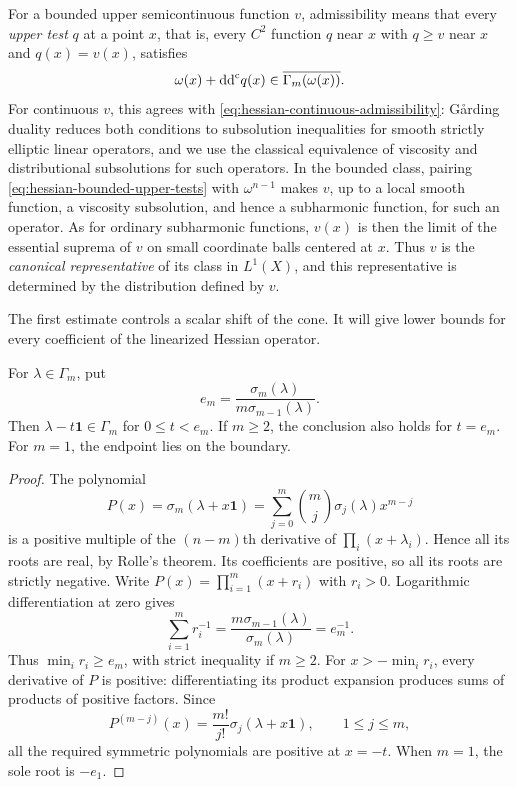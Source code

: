 For a bounded upper semicontinuous function $v$, admissibility means that
every \emph{upper test} $q$ at a point $x$, that is, every $C^2$ function
$q$ near $x$ with $q\geq v$ near $x$ and $q(x)=v(x)$, satisfies
\begin{equation}\label{eq:hessian-bounded-upper-tests}
 \omega(x)+\mathrm{dd}^{\mathrm{c}} q(x)\in\overline{\Gamma_m(\omega(x))}.
\end{equation}
For continuous $v$, this agrees with
\eqref{eq:hessian-continuous-admissibility}: G\aa rding duality reduces
both conditions to subsolution inequalities for smooth strictly elliptic
linear operators, and we use the classical equivalence of viscosity and
distributional subsolutions for such operators. In the bounded class,
pairing \eqref{eq:hessian-bounded-upper-tests} with $\omega^{n-1}$
makes $v$, up to a local smooth function, a viscosity subsolution, and
hence a subharmonic function, for such an operator. As for ordinary
subharmonic functions, $v(x)$ is then the limit of the essential
suprema of $v$ on small coordinate balls centered at $x$. Thus $v$ is
the \emph{canonical representative} of its class in $L^1(X)$, and
this representative is determined by the distribution defined by $v$.

The first estimate controls a scalar shift of the cone. It will give
lower bounds for every coefficient of the linearized Hessian operator.

\begin{lemma}\label{hessian:hessian-cone-shift}
For $\lambda\in\Gamma_m$, put
\[
 e_m=\frac{\sigma_m(\lambda)}{m\sigma_{m-1}(\lambda)}.
\]
Then $\lambda-t\mathbf1\in\Gamma_m$ for $0\leq t<e_m$. If $m\geq2$, the conclusion also holds for $t=e_m$. For $m=1$, the endpoint lies on the boundary.
\end{lemma}
\begin{proof}
The polynomial
\[
 P(x)=\sigma_m(\lambda+x\mathbf1)
     =\sum_{j=0}^m\binom mj\sigma_j(\lambda)x^{m-j}
\]
is a positive multiple of the $(n-m)$th derivative of $\prod_i(x+\lambda_i)$. Hence all its roots are real, by Rolle's theorem. Its coefficients are positive, so all its roots are strictly negative. Write $P(x)=\prod_{i=1}^m(x+r_i)$ with $r_i>0$. Logarithmic differentiation at zero gives
\[
 \sum_{i=1}^m r_i^{-1}
       =\frac{m\sigma_{m-1}(\lambda)}{\sigma_m(\lambda)}
       =e_m^{-1}.
\]
Thus $\min_i r_i\geq e_m$, with strict inequality if $m\geq2$. For $x> -\min_i r_i$, every derivative of $P$ is positive: differentiating its product expansion produces sums of products of positive factors. Since
\[
 P^{(m-j)}(x)=\frac{m!}{j!}\sigma_j(\lambda+x\mathbf1),
 \qquad 1\leq j\leq m,
\]
all the required symmetric polynomials are positive at $x=-t$. When $m=1$, the sole root is $-e_1$.
\end{proof}

